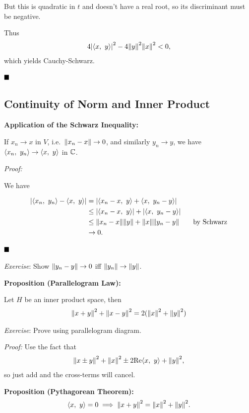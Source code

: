 But this is quadratic in \(t\) and doesn't have a real root, so its
discriminant must be negative.

Thus
\begin{align*}
4\abs{\inner{x}{y}}^2 - 4\norm{y}^2 \norm{x}^2 < 0
,\end{align*} which yields Cauchy-Schwarz.

\(\qed\)

\hypertarget{continuity-of-norm-and-inner-product}{%
\subsection{Continuity of Norm and Inner
Product}\label{continuity-of-norm-and-inner-product}}

\textbf{Application of the Schwarz Inequality:}

If \(x_n \to x\) in \(V\), i.e.~\(\norm{x_n - x} \to 0\), and similarly
\(y_n \to y\), we have \(\inner{x_n}{y_n} \to \inner{x}{y}\) in \(\CC\).

\emph{Proof:}

We have

\begin{align*}
\abs{ \inner{x_n}{y_n} - \inner{x}{y} } &= \abs{ \inner{x_n - x}{y} + \inner{x}{y_n - y} } \\
&\leq \abs{\inner{x_n - x}{y}} + \abs{\inner{x}{y_n - y}} \\
&\leq \norm{x_n - x}\norm{y} + \norm{x} \norm{y_n - y}\quad\quad\text{by Schwarz} \\
& \to 0
.\end{align*}

\(\qed\)

\emph{Exercise}: Show \(\norm{y_n - y} \to 0\) iff
\(\norm{y_n} \to \norm{y}\).

\textbf{Proposition (Parallelogram Law):}

Let \(H\) be an inner product space, then
\begin{align*}
\norm{x+y}^2 + \norm{x-y}^2 = 2(\norm{x}^2 + \norm{y}^2)
\end{align*}

\emph{Exercise}: Prove using parallelogram diagram.

\emph{Proof:} Use the fact that
\begin{align*}
\norm{x \pm y}^2 + \norm{x}^2 \pm 2\mathrm{Re}\inner{x}{y} + \norm{y}^2
,\end{align*} so just add and the cross-terms will cancel.

\textbf{Proposition (Pythagorean Theorem):}
\begin{align*}
\inner{x}{y} = 0 \implies \norm{x+y}^2 = \norm{x}^2 + \norm{y}^2.
\end{align*}


